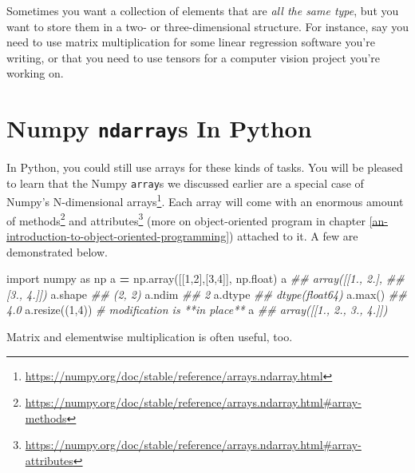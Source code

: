 \documentclass[
  12pt,
  krantz2]{krantz}
\makeatletter
\newenvironment{Shaded}{\begin{snugshade}}{\end{snugshade}}
\newcommand{\BuiltInTok}[1]{#1}
\newcommand{\CommentTok}[1]{\textcolor[rgb]{0.37,0.37,0.37}{\textit{#1}}}
\newcommand{\DecValTok}[1]{\textcolor[rgb]{0.06,0.06,0.06}{#1}}
\newcommand{\ImportTok}[1]{#1}
\newcommand{\NormalTok}[1]{#1}
\newcommand{\OperatorTok}[1]{\textcolor[rgb]{0.43,0.43,0.43}{\textbf{#1}}}
\renewcommand{\href}[2]{#2\footnote{\url{#1}}}
\newenvironment{kframe}{%
\medskip{}
\setlength{\fboxsep}{.8em}
 \def\at@end@of@kframe{}%
 \ifinner\ifhmode%
  \def\at@end@of@kframe{\end{minipage}}%
  \begin{minipage}{\columnwidth}%
 \fi\fi%
 \def\FrameCommand##1{\hskip\@totalleftmargin \hskip-\fboxsep
 \colorbox{shadecolor}{##1}\hskip-\fboxsep
     \hskip-\linewidth \hskip-\@totalleftmargin \hskip\columnwidth}%
 \MakeFramed {\advance\hsize-\width
   \@totalleftmargin\z@ \linewidth\hsize
   \@setminipage}}%
 {\par\unskip\endMakeFramed%
 \at@end@of@kframe}
\renewenvironment{Shaded}{\begin{kframe}}{\end{kframe}}
\makeatother
\begin{document}
Sometimes you want a collection of elements that are \emph{all the same type}, but you want to store them in a two- or three-dimensional structure. For instance, say you need to use matrix multiplication for some linear regression software you're writing, or that you need to use tensors for a computer vision project you're working on.

\hypertarget{numpy-ndarrays-in-python}{%
\section{\texorpdfstring{Numpy \texttt{ndarray}s In Python}{Numpy ndarrays In Python}}\label{numpy-ndarrays-in-python}}

In Python, you could still use arrays for these kinds of tasks. You will be pleased to learn that the Numpy \texttt{array}s we discussed earlier are a special case of \href{https://numpy.org/doc/stable/reference/arrays.ndarray.html}{Numpy's N-dimensional arrays}. Each array will come with an enormous amount of \href{https://numpy.org/doc/stable/reference/arrays.ndarray.html\#array-methods}{methods} and \href{https://numpy.org/doc/stable/reference/arrays.ndarray.html\#array-attributes}{attributes} (more on object-oriented program in chapter \ref{an-introduction-to-object-oriented-programming}) attached to it. A few are demonstrated below.

\begin{Shaded}
\begin{Highlighting}[]
\ImportTok{import}\NormalTok{ numpy }\ImportTok{as}\NormalTok{ np}
\NormalTok{a }\OperatorTok{=}\NormalTok{ np.array([[}\DecValTok{1}\NormalTok{,}\DecValTok{2}\NormalTok{],[}\DecValTok{3}\NormalTok{,}\DecValTok{4}\NormalTok{]], np.}\BuiltInTok{float}\NormalTok{)}
\NormalTok{a}
\CommentTok{\#\# array([[1., 2.],}
\CommentTok{\#\#        [3., 4.]])}
\NormalTok{a.shape}
\CommentTok{\#\# (2, 2)}
\NormalTok{a.ndim}
\CommentTok{\#\# 2}
\NormalTok{a.dtype}
\CommentTok{\#\# dtype(\textquotesingle{}float64\textquotesingle{})}
\NormalTok{a.}\BuiltInTok{max}\NormalTok{()}
\CommentTok{\#\# 4.0}
\NormalTok{a.resize((}\DecValTok{1}\NormalTok{,}\DecValTok{4}\NormalTok{)) }\CommentTok{\# modification is **in place**}
\NormalTok{a}
\CommentTok{\#\# array([[1., 2., 3., 4.]])}
\end{Highlighting}
\end{Shaded}

Matrix and elementwise multiplication is often useful, too.
\end{document}
